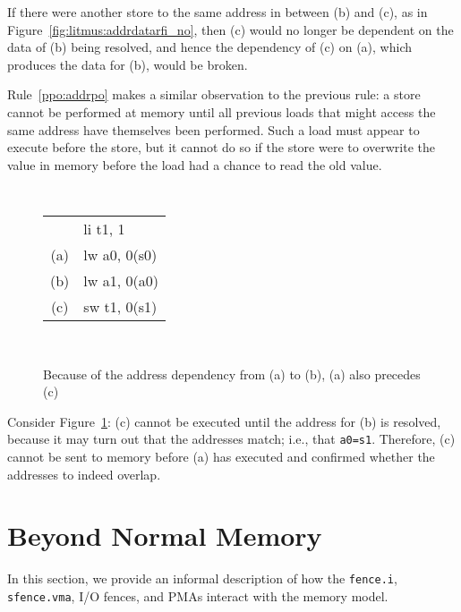 If there were another store to the same address in between (b) and (c), as in Figure~\ref{fig:litmus:addrdatarfi_no}, then (c) would no longer be dependent on the data of (b) being resolved, and hence the dependency of (c) on (a), which produces the data for (b), would be broken.

Rule~\ref{ppo:addrpo} makes a similar observation to the previous rule: a store cannot be performed at memory until all previous loads that might access the same address have themselves been performed.
Such a load must appear to execute before the store, but it cannot do so if the store were to overwrite the value in memory before the load had a chance to read the old value.

\begin{figure}[h!]
  \centering
  {
    \tt\small
    \begin{tabular}{cl}
        & li t1, 1       \\
    (a) & lw a0, 0(s0)   \\
    (b) & lw a1, 0(a0)   \\
    (c) & sw t1, 0(s1)   \\
    \end{tabular}
  }
  ~~~~
  \diagram
  \caption{Because of the address dependency from (a) to (b), (a) also precedes (c)}
  \label{fig:litmus:addrpo}
\end{figure}

Consider Figure~\ref{fig:litmus:addrpo}:
(c) cannot be executed until the address for (b) is resolved, because it may turn out that the addresses match; i.e., that {\tt a0=s1}.  Therefore, (c) cannot be sent to memory before (a) has executed and confirmed whether the addresses to indeed overlap.


\section{Beyond Normal Memory}

In this section, we provide an informal description of how the {\tt fence.i}, {\tt sfence.vma}, I/O fences, and PMAs interact with the memory model.

